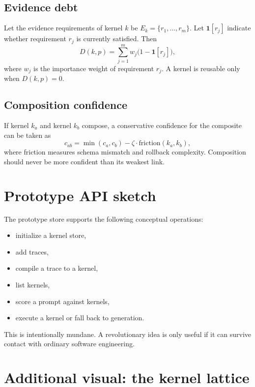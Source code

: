 \documentclass{article}
\begin{document}
\subsection{Evidence debt}
Let the evidence requirements of kernel $k$ be $E_k = \{r_1,\dots,r_m\}$. Let $\mathbf{1}[r_j]$ indicate whether requirement $r_j$ is currently satisfied. Then
\[
D(k,p)=\sum_{j=1}^{m} w_j \bigl(1-\mathbf{1}[r_j]\bigr),
\]
where $w_j$ is the importance weight of requirement $r_j$. A kernel is reusable only when $D(k,p)=0$.

\subsection{Composition confidence}
If kernel $k_a$ and kernel $k_b$ compose, a conservative confidence for the composite can be taken as
\[
 c_{ab} = \min(c_a, c_b) - \zeta \cdot \mathrm{friction}(k_a,k_b),
\]
where friction measures schema mismatch and rollback complexity. Composition should never be more confident than its weakest link.

\section{Prototype API sketch}

The prototype store supports the following conceptual operations:
\begin{itemize}[leftmargin=1.2em]
\item initialize a kernel store,
\item add traces,
\item compile a trace to a kernel,
\item list kernels,
\item score a prompt against kernels,
\item execute a kernel or fall back to generation.
\end{itemize}

This is intentionally mundane. A revolutionary idea is only useful if it can survive contact with ordinary software engineering.

\section{Additional visual: the kernel lattice}
\end{document}
